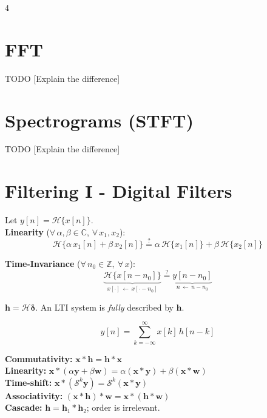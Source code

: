 \documentclass[8pt,a4paper,landscape]{extarticle}
\begin{document}
\begin{multicols*}{4}
\section{FFT}
TODO [Explain the difference]

\section{Spectrograms (STFT)}
TODO [Explain the difference]


\newpage

\section{Filtering I - Digital Filters}

\begin{defn}[title=LTI: Linearity \& time-invariance]
Let $y[n] = \mathcal{H}\{x[n]\}$. \\
\textbf{Linearity} ($\forall\, \alpha,\beta \in\mathbb{C}$, $\forall\, x_1, x_2$):
\[
    \mathcal{H}\{\alpha\, x_1[n] + \beta\, x_2[n]\} \stackrel{?}{=} \alpha\, \mathcal{H}\{x_1[n]\} + \beta\, \mathcal{H}\{x_2[n]\}
\]

\textbf{Time-Invariance} ($\forall\, n_0 \in \mathbb{Z},\ \forall\, x$):
\[
    \underbrace{\mathcal{H}\{x[n - n_0]\}}_{x[\cdot] \,\leftarrow\, x[\cdot - n_0]} \stackrel{?}{=} \underbrace{y[n - n_0]}_{n \,\leftarrow\, n - n_0}
\]
\end{defn}


\begin{thm}[title=Impulse response]
$\mathbf{h}=\mathcal{H}\boldsymbol{\delta}$. An LTI system is \emph{fully} described by $\mathbf{h}$.
\end{thm}

\begin{defn}[title={Convolution $\mathbf{y}=\mathbf{x}*\mathbf{h}$}]
\[y[n]=\sum_{k=-\infty}^{\infty}x[k]\,h[n-k]\]
\end{defn}

\begin{prop}[title=Convolution properties]
\textbf{Commutativity:} $\mathbf{x}*\mathbf{h}=\mathbf{h}*\mathbf{x}$\\
\textbf{Linearity:} $\mathbf{x}*(\alpha\mathbf{y}+\beta\mathbf{w})=\alpha(\mathbf{x}*\mathbf{y})+\beta(\mathbf{x}*\mathbf{w})$\\
\textbf{Time-shift:} $\mathbf{x}*(\mathcal{S}^k\mathbf{y})=\mathcal{S}^k(\mathbf{x}*\mathbf{y})$\\
\textbf{Associativity:} $(\mathbf{x}*\mathbf{h})*\mathbf{w}=\mathbf{x}*(\mathbf{h}*\mathbf{w})$\\
\textbf{Cascade:} $\mathbf{h}=\mathbf{h}_1*\mathbf{h}_2$; order is irrelevant.
\end{prop}


\end{multicols*}
\end{document}
